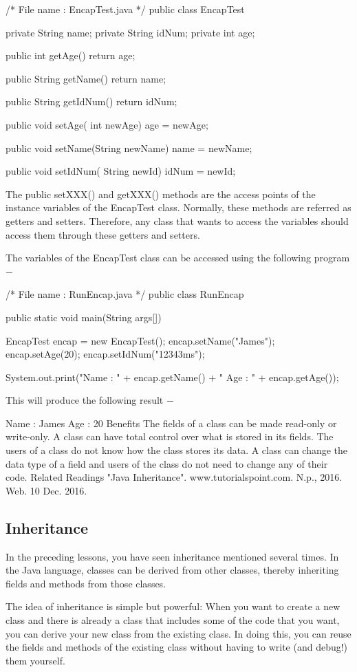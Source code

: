 /* File name : EncapTest.java */
public class EncapTest {
   private String name;
   private String idNum;
   private int age;

   public int getAge() {
      return age;
   }

   public String getName() {
      return name;
   }

   public String getIdNum() {
      return idNum;
   }

   public void setAge( int newAge) {
      age = newAge;
   }

   public void setName(String newName) {
      name = newName;
   }

   public void setIdNum( String newId) {
      idNum = newId;
   }
}
The public setXXX() and getXXX() methods are the access points of the instance variables of the EncapTest class. Normally, these methods are referred as getters and setters. Therefore, any class that wants to access the variables should access them through these getters and setters.

The variables of the EncapTest class can be accessed using the following program −

/* File name : RunEncap.java */
public class RunEncap {

   public static void main(String args[]) {
      EncapTest encap = new EncapTest();
      encap.setName("James");
      encap.setAge(20);
      encap.setIdNum("12343ms");

      System.out.print("Name : " + encap.getName() + " Age : " + encap.getAge());
   }
}
This will produce the following result −

Name : James Age : 20
Benefits
The fields of a class can be made read-only or write-only.
A class can have total control over what is stored in its fields.
The users of a class do not know how the class stores its data. A class can change the data type of a field and users of the class do not need to change any of their code.
Related Readings
"Java Inheritance". www.tutorialspoint.com. N.p., 2016. Web. 10 Dec. 2016.

\subsection{Inheritance}

In the preceding lessons, you have seen inheritance mentioned several times. In the Java language, classes can be derived from other classes, thereby inheriting fields and methods from those classes.

The idea of inheritance is simple but powerful: When you want to create a new class and there is already a class that includes some of the code that you want, you can derive your new class from the existing class. In doing this, you can reuse the fields and methods of the existing class without having to write (and debug!) them yourself.

